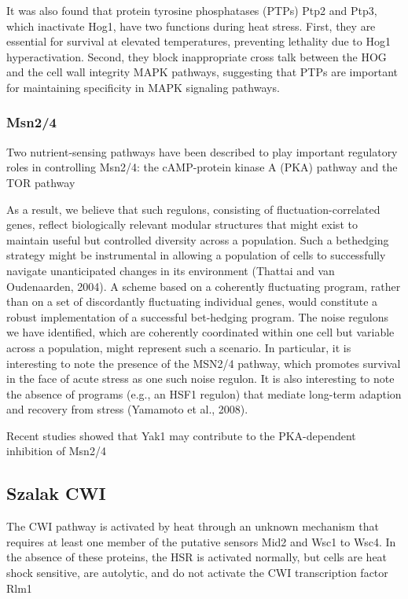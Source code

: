 \documentclass{pracamgr}
\begin{document}
It was also found that protein tyrosine phosphatases (PTPs) Ptp2 and Ptp3, which inactivate Hog1, have two
functions during heat stress. First, they are essential for survival at elevated temperatures, preventing lethality
due to Hog1 hyperactivation. Second, they block inappropriate cross talk between the HOG and the cell wall
integrity MAPK pathways, suggesting that PTPs are important for maintaining specificity in MAPK signaling
pathways.\cite{Winkler02}

\subsubsection{Msn2/4}
Two nutrient-sensing pathways have
been described to play important regulatory roles in controlling
Msn2/4: the cAMP-protein kinase A (PKA) pathway and the TOR
pathway\cite{Bible}

As a result, we believe that such
regulons, consisting of fluctuation-correlated genes, reflect biologically
relevant modular structures that might exist to maintain
useful but controlled diversity across a population. Such a bethedging
strategy might be instrumental in allowing a population
of cells to successfully navigate unanticipated changes in its
environment (Thattai and van Oudenaarden, 2004). A scheme
based on a coherently fluctuating program, rather than on a
set of discordantly fluctuating individual genes, would constitute
a robust implementation of a successful bet-hedging program.
The noise regulons we have identified, which are coherently
coordinated within one cell but variable across a population,
might represent such a scenario. In particular, it is interesting
to note the presence of the MSN2/4 pathway, which promotes
survival in the face of acute stress as one such noise regulon.
It is also interesting to note the absence of programs (e.g., an
HSF1 regulon) that mediate long-term adaption and recovery
from stress (Yamamoto et al., 2008). \cite{CellularNoice}

Recent studies showed that Yak1 may contribute to the PKA-dependent inhibition of Msn2/4\cite{Bible}

\subsection{Szalak CWI}
The CWI pathway is activated by heat
through an unknown mechanism that requires at least one member of the putative sensors Mid2 and Wsc1 to Wsc4. In the absence
of these proteins, the HSR is activated normally, but cells are heat
shock sensitive, are autolytic, and do not activate the CWI transcription factor Rlm1\cite{Bible}
\end{document}
